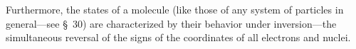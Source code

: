 Furthermore, the states of a molecule (like those of any system of particles in general---see \S~30) are characterized by their behavior under inversion---the simultaneous reversal of the signs of the coordinates of all electrons and nuclei.
